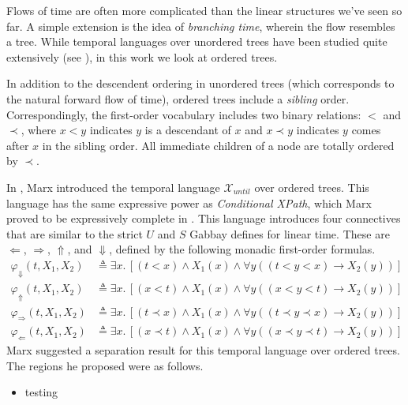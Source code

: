 \documentclass[a4paper,UKenglish,cleveref, autoref, thm-restate]{lipics-v2021}
\begin{document}

Flows of time are often more complicated than the linear structures we've seen so far. A simple extension is the idea of \textit{branching time}, wherein the flow resembles a tree. While temporal languages over unordered trees have been studied quite extensively (see \cite{RabinovichUnordered00}), in this work we look at ordered trees.

In addition to the descendent ordering in unordered trees (which corresponds to the natural forward flow of time), ordered trees include a \textit{sibling} order. Correspondingly, the first-order vocabulary includes two binary relations: $<$ and $\prec$, where $x < y$ indicates $y$ is a descendant of $x$ and $x \prec y$ indicates $y$ comes after $x$ in the sibling order. All immediate children of a node are totally ordered by $\prec$. %

In \cite{xpathComplete}, Marx introduced the temporal language $\mathcal{X}_{until}$ over ordered trees. This language has the same expressive power as \textit{Conditional XPath}, which Marx proved to be expressively complete in \cite{marx2005conditional}. This language introduces four connectives that are similar to the strict $U$ and $S$ Gabbay defines for linear time. These are $\Leftarrow$, $\Rightarrow$, $\Uparrow$, and $\Downarrow$, defined by the following monadic first-order formulas.
\begin{equation*}
    \begin{aligned}
        \varphi_\Downarrow(t, X_1, X_2) &\triangleq \exists x.\, \left[ \left( t < x \right) \land X_1(x) \land \forall y \left( \left( t < y < x \right) \to X_2(y) \right) \right]\\
        \varphi_\Uparrow(t, X_1, X_2) &\triangleq \exists x.\, \left[ \left( x < t \right) \land X_1(x) \land \forall y \left( \left( x < y < t \right) \to X_2(y) \right) \right]\\
        \varphi_\Rightarrow(t, X_1, X_2) &\triangleq \exists x.\, \left[ \left( t \prec x \right) \land X_1(x) \land \forall y \left( \left( t \prec y \prec x \right) \to X_2(y) \right) \right]\\
        \varphi_\Leftarrow(t, X_1, X_2) &\triangleq \exists x.\, \left[ \left( x \prec t \right) \land X_1(x) \land \forall y \left( \left( x \prec y \prec t \right) \to X_2(y) \right) \right]
    \end{aligned}
\end{equation*}
Marx suggested a separation result for this temporal language over ordered trees. The regions he proposed were as follows.
\begin{itemize}
    \item testing
\end{itemize}






\end{document}
